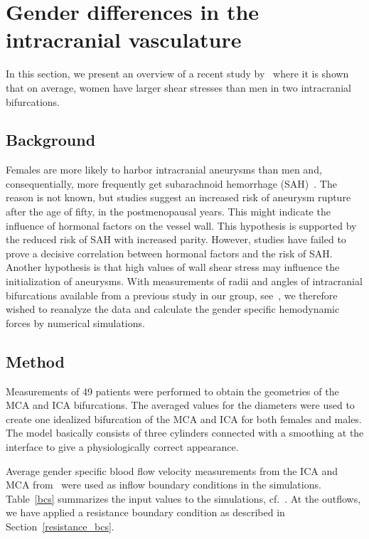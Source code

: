 \section{Gender differences in the intracranial vasculature} \label{gender}

In this section, we present an overview of a recent study
by~\citet{LindekleivValen-SendstadMorganEtAl2010} where it is shown
that on average, women have larger shear stresses than men in two
intracranial bifurcations.

\subsection{Background}

Females are more likely to harbor intracranial aneurysms than men and,
consequentially, more frequently get subarachnoid hemorrhage
(SAH)~\citep{EdenMeurerSanchezEtAl2008}. The reason is not
known, but studies suggest an increased risk of aneurysm rupture after
the age of fifty, in the postmenopausal years. This might indicate the
influence of hormonal factors on the vessel wall. This hypothesis is
supported by the reduced risk of SAH with increased parity. However,
studies have failed to prove a decisive correlation between hormonal
factors and the risk of SAH. Another hypothesis is that high values of
wall shear stress may influence the initialization of aneurysms. With
measurements of radii and angles of intracranial bifurcations
available from a previous study in our group,
see~\citet{IngebrigtsenMorganFaulderEtAl2004}, we therefore wished to
reanalyze the data and calculate the gender specific hemodynamic
forces by numerical simulations.

\subsection{Method}

Measurements of 49 patients were performed to obtain the geometries of
the MCA and ICA bifurcations. The averaged values for the diameters
were used to create one idealized
bifurcation of the MCA and ICA for both females and males. The model
basically consists of three cylinders connected with a smoothing at
the interface to give a physiologically correct appearance.

Average gender specific blood flow velocity measurements from the ICA
and MCA from~\citet{KrejzaSzydlikLiebeskindEtAl2005} were used as
inflow boundary conditions in the simulations. Table~\ref{bcs}
summarizes the input values to the simulations,
cf.~\citet{LindekleivValen-SendstadMorganEtAl2010}.  At the outflows,
we have applied a resistance boundary condition as described in
Section~\ref{resistance_bcs}.

